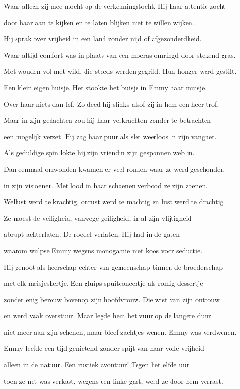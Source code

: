 Waar alleen zij mee mocht
op de verkenningstocht.
Hij haar attentie zocht

door haar aan te kijken
en te laten blijken
niet te willen wijken.

Hij sprak over vrijheid
in een land zonder nijd
of afgezonderdheid.

Waar altijd comfort was
in plaats van een moeras
omringd door stekend gras.

Met wouden vol met wild,
die steeds werden gegrild.
Hun honger werd gestilt.

Een klein eigen huisje.
Het stookte het buisje
in Emmy haar muisje.

Over haar niets dan lof.
Zo deed hij slinks alsof
zij in hem een heer trof.

Maar in zijn gedachten
zou hij haar verkrachten
zonder te betrachten

een mogelijk verzet.
Hij zag haar puur als slet
weerloos in zijn vangnet.

Als geduldige spin
lokte hij zijn vriendin
zijn gesponnen web in.

Dan eenmaal omwonden
kwamen er veel ronden
waar ze werd geschonden

in zijn visioenen.
Met lood in haar schoenen
verbood ze zijn zoenen.

Wellust werd te krachtig,
onrust werd te machtig
en lust werd te drachtig.

Ze moest de veiligheid,
vanwege geiligheid,
in al zijn vlijtigheid

abrupt achterlaten.
De roedel verlaten.
Hij had in de gaten

waarom wulpse Emmy
wegens monogamie
niet koos voor seductie.

Hij genoot als heerschap
echter van gemeenschap
binnen de broederschap

met elk meisjeshertje.
Een gluips spuitconcertje
als romig dessertje

zonder enig berouw
bovenop zijn hoofdvrouw.
Die wist van zijn ontrouw

en werd vaak overstuur.
Maar legde hem het vuur
op de langere duur

niet meer aan zijn schenen,
maar bleef zachtjes wenen.
Emmy was verdwenen.

Emmy leefde een tijd
genietend zonder spijt
van haar volle vrijheid

alleen in de natuur.
Een rustiek avontuur!
Tegen het elfde uur

toen ze net was verkast,
wegens een linke gast,
werd ze door hem verrast.

